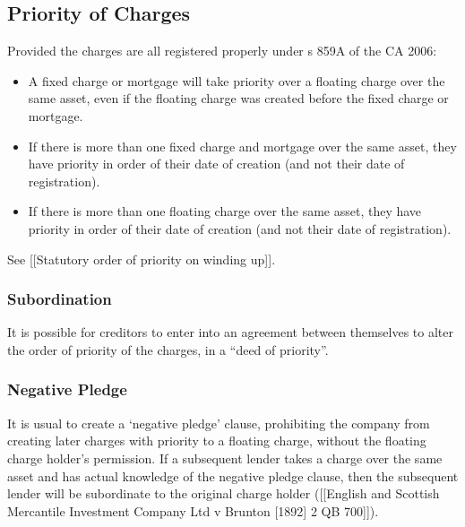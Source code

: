 \documentclass[
]{article}
\providecommand{\tightlist}{%
  \setlength{\itemsep}{0pt}\setlength{\parskip}{0pt}}
\begin{document}
\hypertarget{priority-of-charges}{%
\subsection{Priority of Charges}\label{priority-of-charges}}

Provided the charges are all registered properly under s 859A of the CA
2006:

\begin{itemize}
\tightlist
\item
  A fixed charge or mortgage will take priority over a floating charge
  over the same asset, even if the floating charge was created before
  the fixed charge or mortgage.
\item
  If there is more than one fixed charge and mortgage over the same
  asset, they have priority in order of their date of creation (and not
  their date of registration).
\item
  If there is more than one floating charge over the same asset, they
  have priority in order of their date of creation (and not their date
  of registration).
\end{itemize}

See {[}{[}Statutory order of priority on winding up{]}{]}.

\hypertarget{subordination}{%
\subsubsection{Subordination}\label{subordination}}

It is possible for creditors to enter into an agreement between
themselves to alter the order of priority of the charges, in a ``deed of
priority''.

\hypertarget{negative-pledge}{%
\subsubsection{Negative Pledge}\label{negative-pledge}}

It is usual to create a `negative pledge' clause, prohibiting the
company from creating later charges with priority to a floating charge,
without the floating charge holder's permission. If a subsequent lender
takes a charge over the same asset and has actual knowledge of the
negative pledge clause, then the subsequent lender will be subordinate
to the original charge holder ({[}{[}English and Scottish Mercantile
Investment Company Ltd v Brunton {[}1892{]} 2 QB 700{]}{]}).
\end{document}
